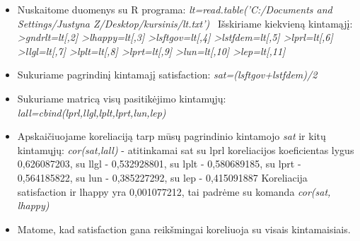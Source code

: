 \documentclass[12pt,a4paper]{article}
\theoremstyle{change}\newtheorem{salyga}{Uždavinys}
\begin{document}
\begin{itemize}
\item Nuskaitome duomenys su R programa: 
\newline
\textit {lt=read.table('C:/Documents and Settings/Justyna Z/Desktop/kursinis/lt.txt')}
\ Išskiriame kiekvieną kintamąjį:
\newline
\textit {>gndrlt=lt[,2] 
\newline >lhappy=lt[,3] 
\newline >lsftgov=lt[,4]
\newline >lstfdem=lt[,5]
\newline >lprl=lt[,6]
\newline >llgl=lt[,7]
\newline >lplt=lt[,8]
\newline >lprt=lt[,9]
\newline >lun=lt[,10]
\newline >lep=lt[,11]}

\item Sukuriame pagrindinį kintamajį satisfaction:
\newline 
\textit{sat=(lsftgov+lstfdem)/2}
\item Sukuriame matricą visų pasitikėjimo kintamųjų:
\newline \textit {lall=cbind(lprl,llgl,lplt,lprt,lun,lep)}
\item Apskaičiuojame koreliaciją tarp mūsų pagrindinio kintamojo \textit{sat} ir kitų kintamųjų:
\newline  \textit{cor(sat,lall)}  -  atitinkamai sat su lprl koreliacijos koeficientas lygus 0,626087203,  su  llgl -  0,532928801, su lplt - 0,580689185, su lprt - 0,564185822, su lun - 0,385227292, su lep - 0,415091887
\newline Koreliacija satisfaction ir  lhappy yra 0,001077212, tai padrėme su komanda 
\newline \textit{cor(sat, lhappy)}
\item Matome, kad satisfaction gana reikšmingai koreliuoja su visais kintamaisiais.


\end{itemize}
\end{document}
